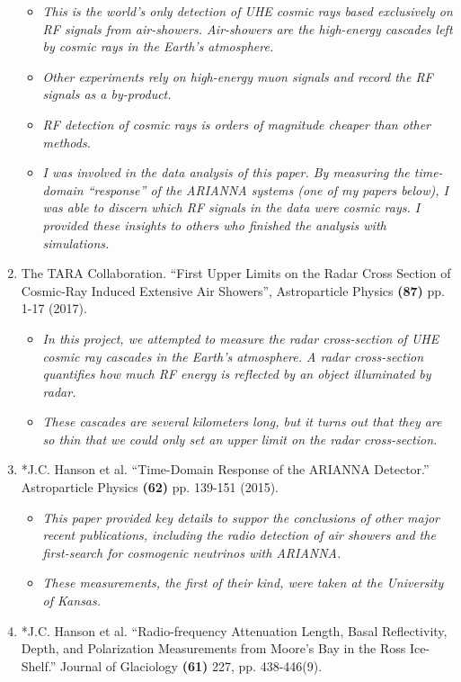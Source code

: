 \documentclass[../../main.tex]{subfiles}
\begin{document}
\begin{enumerate}
\begin{itemize}
\item \textit{This is the world's only detection of UHE cosmic rays based exclusively on RF signals from air-showers.  Air-showers are the high-energy cascades left by cosmic rays in the Earth's atmosphere.}
\item \textit{Other experiments rely on high-energy muon signals and record the RF signals as a by-product.}
\item \textit{RF detection of cosmic rays is orders of magnitude cheaper than other methods.}
\item \textit{I was involved in the data analysis of this paper.  By measuring the time-domain ``response'' of the ARIANNA systems (one of my papers below), I was able to discern which RF signals in the data were cosmic rays.  I provided these insights to others who finished the analysis with simulations.}
\end{itemize}
\item The TARA Collaboration. ``First Upper Limits on the Radar Cross Section of Cosmic-Ray Induced Extensive Air Showers'', Astroparticle Physics \textbf{(87)} pp. 1-17 (2017).
\begin{itemize}
\item \textit{In this project, we attempted to measure the radar cross-section of UHE cosmic ray cascades in the Earth's atmosphere. A radar cross-section quantifies how much RF energy is reflected by an object illuminated by radar.}
\item \textit{These cascades are several kilometers long, but it turns out that they are so thin that we could only set an upper limit on the radar cross-section.}
\end{itemize}
\item *J.C. Hanson et al. ``Time-Domain Response of the ARIANNA Detector.'' Astroparticle Physics \textbf{(62)} pp. 139-151 (2015).
\begin{itemize}
\item \textit{This paper provided key details to suppor the conclusions of other major recent publications, including the radio detection of air showers and the first-search for cosmogenic neutrinos with ARIANNA.}
\item \textit{These measurements, the first of their kind, were taken at the University of Kansas.}
\end{itemize}
\item *J.C. Hanson et al. ``Radio-frequency Attenuation Length, Basal Reflectivity, Depth, and Polarization Measurements from Moore's Bay in the Ross Ice-Shelf.'' Journal of Glaciology \textbf{(61)} 227, pp. 438-446(9).

\end{enumerate}
\end{document}
